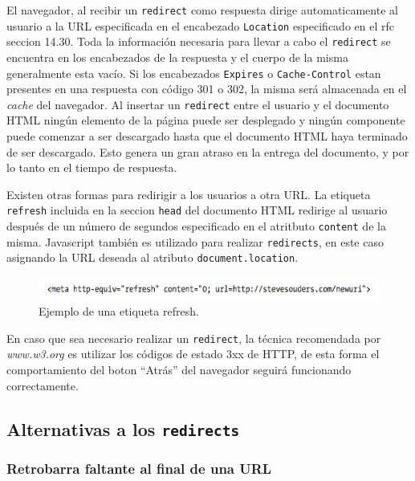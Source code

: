 \documentclass[a4paper,12pt]{report}
\begin{document}
El navegador, al recibir un \texttt{redirect} como respuesta dirige automaticamente al usuario a la URL especificada en el encabezado \texttt{Location}
especificado en el rfc \cite{rfc2616} seccion 14.30. Toda la información necesaria para llevar a cabo el \texttt{redirect} se encuentra en los encabezados de la respuesta
y el cuerpo de la misma generalmente esta vacío. Si los encabezados \texttt{Expires}
o \texttt{Cache-Control} estan presentes en una respuesta con código 301 o 302, la misma será almacenada en el \emph{cache} del navegador.
Al insertar un \texttt{redirect} entre el usuario y el documento HTML ningún elemento de la página puede ser desplegado y ningún componente
puede comenzar a ser descargado hasta que el documento HTML haya terminado de ser descargado. Esto genera un gran atraso en la entrega del documento,
y por lo tanto en el tiempo de respuesta.

Existen otras formas para redirigir a los usuarios a otra URL. La etiqueta \texttt{refresh} incluida en la seccion \texttt{head}
 del documento HTML redirige al usuario después de un número de segundos especificado en el atritbuto \texttt{content} de la misma.
Javascript también es utilizado para realizar \texttt{redirects}, en este caso asignando la URL deseada al atributo \texttt{document.location}.

\begin{figure}[h]
\centering
\includegraphics[width=1\textwidth]{figuras/hpws/meta-refresh.jpg}
	\caption{Ejemplo de una etiqueta refresh.}
    \label{fig.redirect}
\end{figure}

En caso que sea necesario realizar un \texttt{redirect}, la técnica recomendada por \emph{www.w3.org} es utilizar los códigos de estado 3xx de HTTP, de esta forma el
comportamiento del boton ``Atrás'' del navegador seguirá funcionando correctamente.

\subsection{Alternativas a los \texttt{redirects}}

\subsubsection{Retrobarra faltante al final de una URL}
\end{document}
